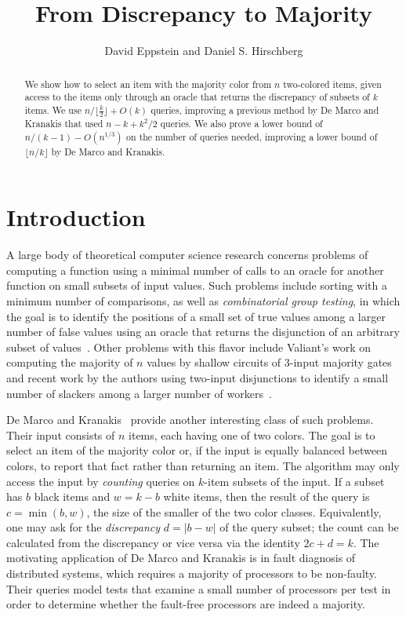 \documentclass[11pt]{llncs}
\title{From Discrepancy to Majority}
\author{David Eppstein and Daniel S. Hirschberg}
\institute{Department of Computer Science, University of California, Irvine\thanks{David Eppstein was supported in part by NSF grant  CCF-1228639.}}
\begin{document}
\maketitle

\begin{abstract}
We show how to select an item with the majority color from $n$ two-colored items, given access to the items only through an oracle that returns the discrepancy of subsets of $k$ items. We use $n/\lfloor\tfrac{k}{2}\rfloor+O(k)$ queries, improving a previous method by De Marco and Kranakis that used $n-k+k^2/2$ queries. We also prove a lower bound of $n/(k-1)-O(n^{1/3})$ on the number of queries needed, improving a lower bound of $\lfloor n/k\rfloor$ by De Marco and Kranakis.
\end{abstract}

\section{Introduction}

A large body of theoretical computer science research concerns problems of computing a function using a minimal number of calls to an oracle for another function on small subsets of input values. Such problems include sorting with a minimum number of comparisons, as well as \emph{combinatorial group testing}, in which the goal is to identify the positions of a small set of true values among a larger number of false values using an oracle that returns the disjunction of an arbitrary subset of values~\cite{DuHwa-CGT-00,EppGooHir-SJC-07}. Other problems with this flavor include Valiant's work on computing the majority of $n$ values by shallow circuits of 3-input majority gates~\cite{Val-JA-84} and recent work by the authors  using two-input disjunctions to identify a small number of slackers among a larger number of workers~\cite{EppGooHir-WADS-13}.

De Marco and Kranakis~\cite{DeMKra-DMAA-15} provide another interesting  class of such problems. Their input consists of $n$ items, each having one of two colors. The goal is to select an item of the majority color or, if the input is equally balanced between colors, to report that fact rather than returning an item. The algorithm may only access the input by \emph{counting} queries on $k$-item subsets of the input. If a subset has $b$ black items and $w=k-b$ white items, then the result of the query is $c=\min(b,w)$, the size of the smaller of the two color classes. Equivalently, one may ask for the \emph{discrepancy} $d=|b-w|$ of the query subset; the count can be calculated from the discrepancy or vice versa via the identity $2c+d=k$. The motivating application of De Marco and Kranakis is in fault diagnosis of distributed systems, which requires a majority of processors to be non-faulty. Their queries model tests that examine a small number of processors per test in order to determine whether the fault-free processors are indeed a majority.
\end{document}
